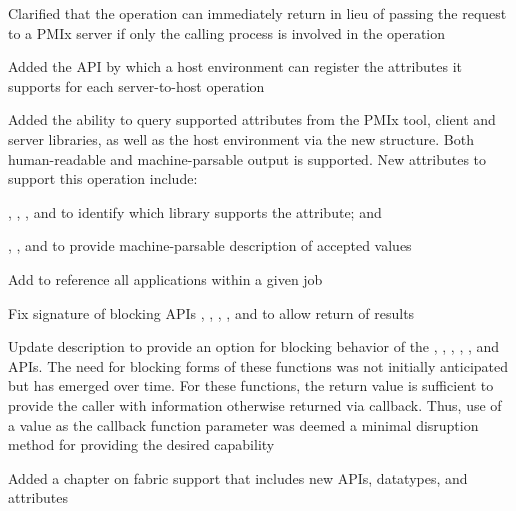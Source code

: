 \begin{compactitemize}
    \item Clarified that the  operation can immediately return  in lieu of passing the request to a \ac{PMIx} server if only the calling process is involved in the operation
    \item Added the  \ac{API} by which a host environment can register the attributes it supports for each server-to-host operation
    \item Added the ability to query supported attributes from the \ac{PMIx} tool, client and server libraries, as well as the host environment via the new  structure. Both human-readable and machine-parsable output is supported. New attributes to support this operation include:
    \begin{compactitemize}
        \item {}, , , and  to identify which library supports the attribute; and
        \item {}, , and  to provide machine-parsable description of accepted values
    \end{compactitemize}
    \item Add  to reference all applications within a given job
    \item Fix signature of blocking APIs , , , , and  to allow return of results
    \item Update description to provide an option for blocking behavior of the , , , , , and  APIs. The need for blocking forms of these functions was not initially anticipated but has emerged over time. For these functions, the return value is sufficient to provide the caller with information otherwise returned via callback. Thus, use of a  value as the callback function parameter was deemed a minimal disruption method for providing the desired capability
    \item Added a chapter on fabric support that includes new \acp{API}, datatypes, and attributes

\end{compactitemize}
